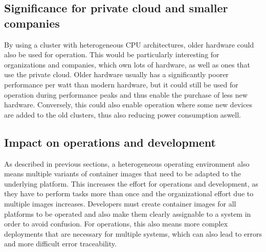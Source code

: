 \subsection{Significance for private cloud and smaller companies}
By using a cluster with heterogeneous CPU architectures, older hardware could
also be used for operation. This would be particularly interesting for organizations and
companies, which own lots of hardware, as well as
ones that use the private cloud. Older hardware usually has a
significantly poorer performance per watt than modern hardware, but it could
still be used for operation during performance peaks and thus enable the
purchase of less new hardware.  Conversely, this could also enable operation
where some new devices are added to the old clusters, thus also reducing power
consumption aswell.

\subsection{Impact on operations and development}
As described in previous sections, a heterogeneous operating environment also means multiple variants of container images that need to be adapted to the underlying platform. This increases the effort for operations and development, as they have to perform tasks more than once and the organizational effort due to multiple images increases. Developers must create container images for all platforms to be operated and also make them clearly assignable to a system in order to avoid confusion. For operations, this also means more complex deployments that are necessary for multiple systems, which can also lead to errors and more difficult error traceability.


